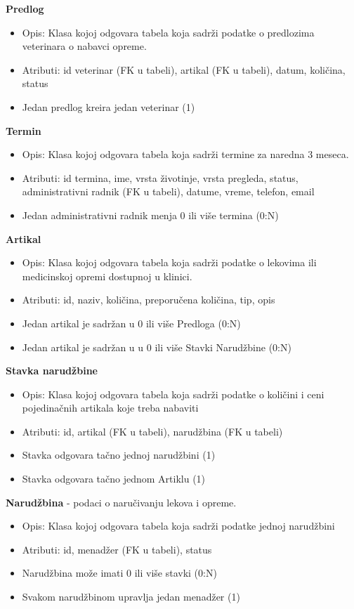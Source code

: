 \indent\textbf{Predlog}
\begin{itemize}
    \item Opis: Klasa kojoj odgovara tabela koja sadrži podatke o predlozima veterinara o nabavci opreme.
    \item Atributi: id veterinar (FK u tabeli), artikal (FK u tabeli), datum, količina, status
    \item Jedan predlog kreira jedan veterinar (1)
\end{itemize}

\indent\textbf{Termin}
\begin{itemize}
    \item Opis: Klasa kojoj odgovara tabela koja sadrži termine za naredna 3 meseca.
    \item Atributi: id termina, ime, vrsta životinje, vrsta pregleda, status, administrativni radnik (FK u tabeli), datume, vreme, telefon, email
    \item Jedan administrativni radnik menja 0 ili više termina (0:N)
\end{itemize}

\indent\textbf{Artikal}
\begin{itemize}
    \item Opis: Klasa kojoj odgovara tabela koja sadrži podatke o lekovima ili medicinskoj opremi dostupnoj u klinici.
    \item Atributi: id, naziv, količina, preporučena količina, tip, opis
    \item Jedan artikal je sadržan u 0 ili više Predloga (0:N)
    \item Jedan artikal je sadržan u u 0 ili više Stavki Narudžbine (0:N)
\end{itemize}

\indent\textbf{Stavka narudžbine}
\begin{itemize}
    \item Opis: Klasa kojoj odgovara tabela koja sadrži podatke o količini i ceni pojedinačnih artikala koje treba nabaviti
    \item Atributi: id, artikal (FK u tabeli), narudžbina (FK u tabeli)
    \item Stavka odgovara tačno jednoj narudžbini (1)
    \item Stavka odgovara tačno jednom Artiklu (1)
\end{itemize}

\indent\textbf{Narudžbina} - podaci o naručivanju lekova i opreme.
\begin{itemize}
    \item Opis: Klasa kojoj odgovara tabela koja sadrži podatke jednoj narudžbini
    \item Atributi: id, menadžer (FK u tabeli), status
    \item Narudžbina može imati 0 ili više stavki (0:N)
    \item Svakom narudžbinom upravlja jedan menadžer (1)
\end{itemize}













